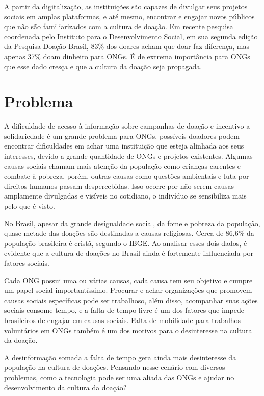 \documentclass[conference]{IEEEtran}
\begin{document}
A partir da digitalização, as instituições são capazes de divulgar seus projetos sociais em amplas plataformas, e até mesmo, encontrar e engajar novos públicos que não são familiarizados com a cultura de doação. Em recente pesquisa coordenada pelo Instituto para o Desenvolvimento Social, em sua segunda edição da Pesquisa Doação Brasil, 83\% dos doares acham que doar faz diferença, mas apenas 37\% doam dinheiro para ONGs. É de extrema importância para ONGs que esse dado cresça e que a cultura da doação seja propagada.

 
\section{Problema}
A dificuldade de acesso à informação sobre campanhas de doação e incentivo a solidariedade é um grande problema para ONGs, possíveis doadores podem encontrar dificuldades em achar uma instituição que esteja alinhada aos seus interesses, devido a grande quantidade de ONGs e projetos existentes.  Algumas causas sociais chamam mais atenção da população como crianças carentes e combate à pobreza, porém, outras causas como questões ambientais e luta por direitos humanos passam despercebidas. Isso ocorre por não serem causas amplamente divulgadas e visíveis no cotidiano, o indivíduo se sensibiliza mais pelo que é visto. 

No Brasil, apesar da grande desigualdade social, da fome e pobreza da população, quase metade das doações são destinadas a causas religiosas. Cerca de 86,6\% da população brasileira é cristã, segundo o IBGE. Ao analisar esses dois dados, é evidente que a cultura de doações no Brasil ainda é fortemente influenciada por fatores sociais. 

Cada ONG possui uma ou várias causas, cada causa tem seu objetivo e cumpre um papel social importantíssimo. Procurar e achar organizações que promovem causas sociais específicas pode ser trabalhoso, além disso, acompanhar suas ações sociais consome tempo, e a falta de tempo livre é um dos fatores que impede brasileiros de engajar em causas sociais. Falta de mobilidade para trabalhos voluntários em ONGs também é um dos motivos para o desinteresse na cultura da doação. \cite{goff2020identifying}

A desinformação somada a falta de tempo gera ainda mais desinteresse da população na cultura de doações. Pensando nesse cenário com diversos problemas, como a tecnologia pode ser uma aliada das ONGs e ajudar no desenvolvimento da cultura da doação?
\end{document}
